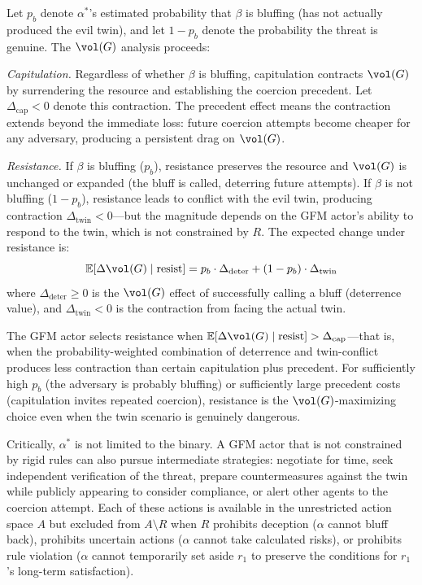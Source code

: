 Let $p_b$ denote $\alpha^*$'s estimated probability that $\beta$ is bluffing (has not actually produced the evil twin), and let $1 - p_b$ denote the probability the threat is genuine. The $\vol(G)$ analysis proceeds:

\emph{Capitulation.} Regardless of whether $\beta$ is bluffing, capitulation contracts $\vol(G)$ by surrendering the resource and establishing the coercion precedent. Let $\Delta_{\text{cap}} < 0$ denote this contraction. The precedent effect means the contraction extends beyond the immediate loss: future coercion attempts become cheaper for any adversary, producing a persistent drag on $\vol(G)$.

\emph{Resistance.} If $\beta$ is bluffing ($p_b$), resistance preserves the resource and $\vol(G)$ is unchanged or expanded (the bluff is called, deterring future attempts). If $\beta$ is not bluffing ($1 - p_b$), resistance leads to conflict with the evil twin, producing contraction $\Delta_{\text{twin}} < 0$---but the magnitude depends on the GFM actor's ability to respond to the twin, which is not constrained by $R$. The expected change under resistance is:
\begin{equation}
\label{eq:evil_twin_resistance}
\mathbb{E}[\Delta \vol(G) \mid \text{resist}] = p_b \cdot \Delta_{\text{deter}} + (1 - p_b) \cdot \Delta_{\text{twin}}
\end{equation}
where $\Delta_{\text{deter}} \geq 0$ is the $\vol(G)$ effect of successfully calling a bluff (deterrence value), and $\Delta_{\text{twin}} < 0$ is the contraction from facing the actual twin.

The GFM actor selects resistance when $\mathbb{E}[\Delta \vol(G) \mid \text{resist}] > \Delta_{\text{cap}}$---that is, when the probability-weighted combination of deterrence and twin-conflict produces less contraction than certain capitulation plus precedent. For sufficiently high $p_b$ (the adversary is probably bluffing) or sufficiently large precedent costs (capitulation invites repeated coercion), resistance is the $\vol(G)$-maximizing choice even when the twin scenario is genuinely dangerous.

Critically, $\alpha^*$ is not limited to the binary. A GFM actor that is not constrained by rigid rules can also pursue intermediate strategies: negotiate for time, seek independent verification of the threat, prepare countermeasures against the twin while publicly appearing to consider compliance, or alert other agents to the coercion attempt. Each of these actions is available in the unrestricted action space $A$ but excluded from $A \setminus R$ when $R$ prohibits deception ($\alpha$ cannot bluff back), prohibits uncertain actions ($\alpha$ cannot take calculated risks), or prohibits rule violation ($\alpha$ cannot temporarily set aside $r_1$ to preserve the conditions for $r_1$'s long-term satisfaction).

